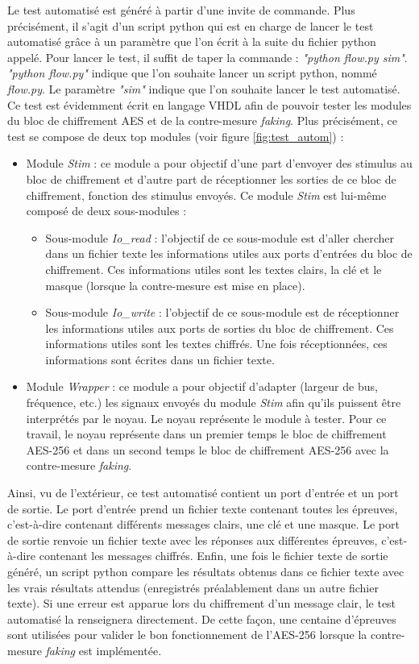 \documentclass[oneside]{book}
\begin{document}
Le test automatisé est généré à partir d'une invite de commande. Plus précisément, il s'agit d'un script python qui est en charge de lancer le test automatisé grâce à un paramètre que l'on écrit à la suite du fichier python appelé. Pour lancer le test, il suffit de taper la commande : \textit{"python flow.py sim"}. \\ \textit{"python flow.py"} indique que l'on souhaite lancer un script python, nommé \textit{flow.py}. Le paramètre \textit{"sim"} indique que l'on souhaite lancer le test automatisé. Ce test est évidemment écrit en langage VHDL afin de pouvoir tester les modules du bloc de chiffrement AES et de la contre-mesure \textit{faking}. Plus précisément, ce test se compose de deux top modules (voir figure \ref{fig:test_autom}) : 
\begin{itemize}
\item Module \textit{Stim} : ce module a pour objectif d'une part d'envoyer des stimulus au bloc de chiffrement et d'autre part de réceptionner les sorties de ce bloc de chiffrement, fonction des stimulus envoyés. Ce module \textit{Stim} est lui-même composé de deux sous-modules : 
\begin{itemize}
\item Sous-module \textit{Io\_read} : l'objectif de ce sous-module est d'aller chercher dans un fichier texte les informations utiles aux ports d'entrées du bloc de chiffrement. Ces informations utiles sont les textes clairs, la clé et le masque (lorsque la contre-mesure est mise en place).
\item Sous-module \textit{Io\_write} : l'objectif de ce sous-module est de réceptionner les informations utiles aux ports de sorties du bloc de chiffrement. Ces informations utiles sont les textes chiffrés. Une fois réceptionnées, ces informations sont écrites dans un fichier texte.
\end{itemize} 
\item Module \textit{Wrapper} : ce module a pour objectif d'adapter (largeur de bus, fréquence, etc.) les signaux envoyés du module \textit{Stim} afin qu'ils puissent être interprétés par le noyau. Le noyau représente le module à tester. Pour ce travail, le noyau représente dans un premier temps le bloc de chiffrement AES-256 et dans un second temps le bloc de chiffrement AES-256 avec la contre-mesure \textit{faking}.
\end{itemize}

Ainsi, vu de l'extérieur, ce test automatisé contient un port d'entrée et un port de sortie. Le port d'entrée prend un fichier texte contenant toutes les épreuves, c'est-à-dire contenant différents messages clairs, une clé et une masque. Le port de sortie renvoie un fichier texte avec les réponses aux différentes épreuves, c'est-à-dire contenant les messages chiffrés. Enfin, une fois le fichier texte de sortie généré, un script python compare les résultats obtenus dans ce fichier texte avec les vrais résultats attendus (enregistrés préalablement dans un autre fichier texte). Si une erreur est apparue lors du chiffrement d'un message clair, le test automatisé la renseignera directement. De cette façon, une centaine d'épreuves sont utilisées pour valider le bon fonctionnement de l'AES-256 lorsque la contre-mesure \textit{faking} est implémentée.
\end{document}
